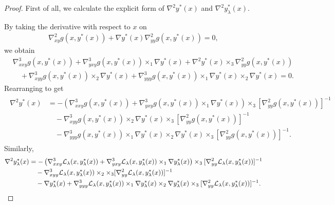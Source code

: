 \begin{proof}
{First of all, we calculate the explicit form of $\nabla^2 y^*(x)$ and $\nabla^2 y_{\lambda}^*(x)$.}

    By taking the derivative with respect to $x$ on
    \begin{align*}
        \nabla_{xy}^2 g(x,y^*(x)) + \nabla y^*(x) \nabla_{yy}^2 g(x,y^*(x)) =0,
    \end{align*}
    we obtain
    \begin{align*}
        & \nabla_{xxy}^3 g(x,y^*(x)) + \nabla_{yxy}^3 g(x,y^*(x)) \times_{1}  \nabla y^*(x) + \nabla^2 y^*(x) \times_3 \nabla_{yy}^2 g(x,y^*(x)) \\
        &\quad + \nabla_{xyy}^3 g(x,y^*(x)) \times_2 \nabla y^*(x)  +\nabla_{yyy}^3 g(x,y^*(x)) \times_1 \nabla y^*(x) \times_2 \nabla y^*(x) = 0.
    \end{align*}
    Rearranging to get
    {\begin{align} \label{eq:nabla2-yx}
    \begin{split}
         \nabla^2 y^*(x) 
        &= -\left( \nabla_{xxy}^3 g(x,y^*(x)) + \nabla_{yxy}^3 g(x,y^*(x)) \times_1 \nabla y^*(x) 
        \right)  \times_3 [\nabla_{yy}^2 g(x,y^*(x))]^{-1} \\
        &\quad -
        \nabla_{xyy}^3 g(x,y^*(x)) \times_2 \nabla y^*(x) \times_3 [\nabla_{yy}^2 g(x,y^*(x))]^{-1} \\
        &\quad-  \nabla_{yyy}^3 g(x,y^*(x)) \times_1 \nabla y^*(x) \times_2 \nabla y^*(x)    \times_3 [\nabla_{yy}^2 g(x,y^*(x))]^{-1}.
    \end{split}
    \end{align}}
    Similarly,
    {
    \begin{align} \label{eq:nabla2-yx-lambda}
    \begin{split}
        \nabla^2 y_{\lambda}^*(x)  &= -\left( \nabla_{xxy}^3 \fL_{\lambda} (x, y_{\lambda}^*(x)) + \nabla_{yxy}^3 \fL_\lambda(x, y_{\lambda}^*(x)) \times_1 \nabla y_{\lambda}^*(x)  \right) \times_3
        [ \nabla_{yy}^2 \fL_{\lambda}(x,y_{\lambda}^*(x))  ]^{-1} \\
        &\quad - 
        \nabla_{xyy}^3 \fL_{\lambda}(x,y_{\lambda}^*(x))
        \times_2 \times_3 [ \nabla_{yy}^2 \fL_{\lambda}(x,y_{\lambda}^*(x))]^{-1} \\
        &\quad - 
        \nabla y_{\lambda}^*(x)   +  
         \nabla_{yyy}^3 \fL_{\lambda} (x,y_{\lambda}^*(x))
        \times_1 \nabla y_{\lambda}^*(x)
        \times_2 \nabla y_{\lambda}^*(x) 
         \times_3 [ \nabla_{yy}^2 \fL_{\lambda}(x,y_{\lambda}^*(x))]^{-1}.

\end{split}
\end{align}}
\end{proof}
